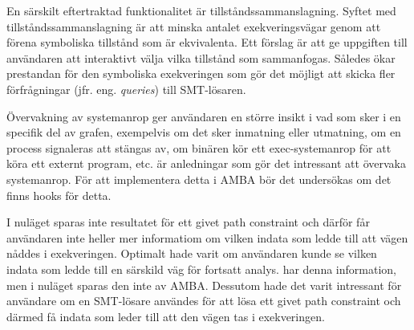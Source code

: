 En särskilt eftertraktad funktionalitet är tillståndssammanslagning. Syftet
med tillståndssammanslagning är att minska antalet exekveringsvägar genom att förena
symboliska tillstånd som är ekvivalenta. Ett förslag är att ge uppgiften till
användaren att interaktivt välja vilka tillstånd som sammanfogas. Således ökar
prestandan för den symboliska exekveringen som gör det möjligt att skicka fler
förfrågningar (jfr. eng. \emph{queries}) till SMT-lösaren.

Övervakning av systemanrop ger användaren en större
insikt i vad som sker i en specifik del av grafen, exempelvis om det sker
inmatning eller utmatning, om en process signaleras att stängas av, om binären
kör ett exec-systemanrop för att köra ett externt program, etc. är anledningar
som gör det intressant att övervaka systemanrop. För att implementera detta i
AMBA bör det undersökas om det finns hooks för detta.

I nuläget sparas inte resultatet för ett givet path constraint
och därför får användaren inte heller mer informatiom om vilken indata som ledde
till att vägen nåddes i exekveringen. Optimalt hade varit om användaren kunde se
vilken indata som ledde till en särskild väg för fortsatt analys. \stoe{} har
denna information, men i nuläget sparas den inte av AMBA. Dessutom hade det
varit intressant för användare om en SMT-lösare användes för att lösa ett givet
path constraint och därmed få indata som leder till att den vägen tas i
exekveringen.

